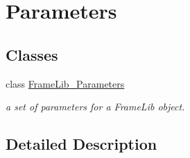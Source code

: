 \hypertarget{group___parameters}{}\section{Parameters}
\label{group___parameters}
\subsection*{Classes}
\begin{DoxyCompactItemize}
\item 
class \hyperlink{class_frame_lib___parameters}{Frame\+Lib\+\_\+\+Parameters}
\begin{DoxyCompactList}\small\item\em a set of parameters for a Frame\+Lib object. \end{DoxyCompactList}\end{DoxyCompactItemize}


\subsection{Detailed Description}
